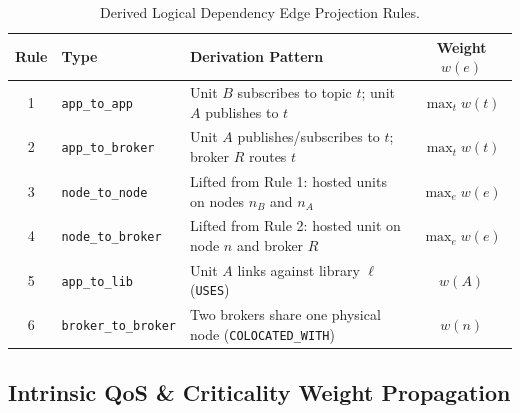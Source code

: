 \documentclass[sigconf,9pt]{acmart}
\begin{document}
\begin{table}[t]
\centering
\caption{Derived Logical Dependency Edge Projection Rules.}
\label{tab:dep_rules}
\small
\begin{tabularx}{\columnwidth}{c l X c}
\toprule
\textbf{Rule} & \textbf{Type} & \textbf{Derivation Pattern} & \textbf{Weight $w(e)$} \\
\midrule
1 & \texttt{app\_to\_app} & Unit $B$ subscribes to topic $t$; unit $A$ publishes to $t$ & $\max_{t} w(t)$ \\
2 & \texttt{app\_to\_broker} & Unit $A$ publishes/subscribes to $t$; broker $R$ routes $t$ & $\max_{t} w(t)$ \\
3 & \texttt{node\_to\_node} & Lifted from Rule 1: hosted units on nodes $n_B$ and $n_A$ & $\max_{e} w(e)$ \\
4 & \texttt{node\_to\_broker} & Lifted from Rule 2: hosted unit on node $n$ and broker $R$ & $\max_{e} w(e)$ \\
5 & \texttt{app\_to\_lib} & Unit $A$ links against library $\ell$ (\texttt{USES}) & $w(A)$ \\
6 & \texttt{broker\_to\_broker} & Two brokers share one physical node (\texttt{COLOCATED\_WITH}) & $w(n)$ \\
\bottomrule
\end{tabularx}
\end{table}

\subsection{Intrinsic QoS \& Criticality Weight Propagation}
\end{document}
